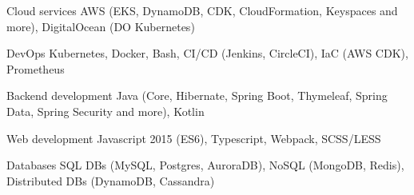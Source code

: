 

\begin{cvskills}

  \cvskill
    {Cloud services} %
    {AWS (EKS, DynamoDB, CDK, CloudFormation, Keyspaces and more), DigitalOcean (DO Kubernetes)} %

  \cvskill
    {DevOps} %
    {Kubernetes, Docker, Bash, CI/CD (Jenkins, CircleCI), IaC (AWS CDK), Prometheus} %

  \cvskill
    {Backend development} %
    {Java (Core, Hibernate, Spring Boot, Thymeleaf, Spring Data, Spring Security and more), Kotlin} %

  \cvskill
    {Web development} %
    {Javascript 2015 (ES6), Typescript, Webpack, SCSS/LESS} %

  \cvskill
  {Databases} %
  {SQL DBs (MySQL, Postgres, AuroraDB), NoSQL (MongoDB, Redis), Distributed DBs (DynamoDB, Cassandra)} %

\end{cvskills}
